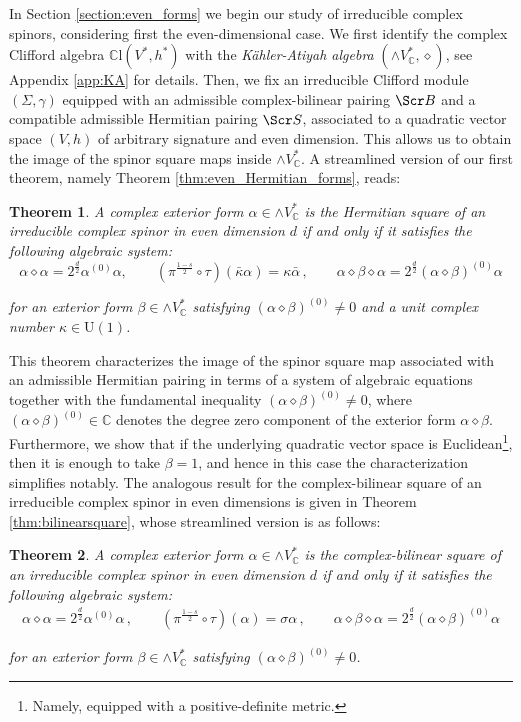 \documentclass[10pt,a4paper,twoside,reqno]{amsart}
\theoremstyle{plain}
\newtheorem{thm}{Theorem}[section]
\theoremstyle{definition}
\theoremstyle{remark}
\def\C{\mathbb{C}}
\def\scB{\Scr B}
\def\scS{\Scr S}
\def\U{\mathrm{U}}
\begin{document}
In Section \ref{section:even_forms} we begin our study of irreducible complex spinors, considering first the even-dimensional case. We first identify the complex Clifford algebra $\C\mathrm{l}(V^*,h^*)$ with the \emph{Kähler-Atiyah algebra} $(\wedge V^*_\C,\diamond)$, see Appendix \ref{app:KA} for details. Then, we fix an irreducible Clifford module $(\Sigma,\gamma)$ equipped with an admissible complex-bilinear pairing $\scB$ and a compatible admissible Hermitian pairing $\scS$, associated to a quadratic vector space $(V,h)$ of arbitrary signature and even dimension. This allows us to obtain the image of the spinor square maps inside $\wedge V^*_\C$. A streamlined version of our first theorem, namely Theorem \ref{thm:even_Hermitian_forms}, reads:

\begin{thm}
A complex exterior form $\alpha\in\wedge V^*_\C$ is the Hermitian square of an irreducible complex spinor in even dimension $d$ if and only if it satisfies the following algebraic system:   
\begin{equation*}
\alpha\diamond\alpha = 2^{\frac{d}{2}}\alpha^{(0)}\alpha,\qquad(\pi^{\frac{1-s}{2}}\circ\tau)(\bar\kappa\alpha) = \kappa \bar{\alpha}\, , \qquad \alpha \diamond \beta \diamond \alpha=2^{\frac{d}{2}}(\alpha\diamond\beta)^{(0)}\alpha
\end{equation*}

\noindent
for an exterior form $\beta\in\wedge V^*_\C$ satisfying $(\alpha\diamond\beta)^{(0)} \neq 0$ and a unit complex number $\kappa\in \U(1)$.
\end{thm}

\noindent
This theorem characterizes the image of the spinor square map associated with an admissible Hermitian pairing in terms of a system of algebraic equations together with the fundamental inequality $(\alpha\diamond\beta)^{(0)} \neq 0$, where $(\alpha\diamond\beta)^{(0)}\in\C$ denotes the degree zero component of the exterior form $\alpha\diamond\beta$. Furthermore, we show that if the underlying quadratic vector space is Euclidean\footnote{Namely, equipped with a positive-definite metric.}, then it is enough to take $\beta = 1$, and hence in this case the characterization simplifies notably. The analogous result for the complex-bilinear square of an irreducible complex spinor in even dimensions is given in Theorem \ref{thm:bilinearsquare}, whose streamlined version is as follows:

\begin{thm} 
A complex exterior form $\alpha\in\wedge V^*_\C$ is the complex-bilinear square of an irreducible complex spinor in even dimension $d$ if and only if it satisfies the following algebraic system:   
\begin{eqnarray*}
\alpha\diamond\alpha = 2^{\frac{d}{2}} \alpha^{(0)}\alpha\,, \qquad (\pi^{\frac{1-s}{2}}\circ\tau) (\alpha) = \sigma \alpha\, , \qquad \alpha \diamond \beta \diamond \alpha = 2^{\frac{d}{2}}(\alpha\diamond\beta)^{(0)}\alpha
\end{eqnarray*}

\noindent
for an exterior form $\beta\in\wedge V^*_\C$ satisfying $(\alpha\diamond\beta)^{(0)} \neq 0$.
\end{thm}
\end{document}
